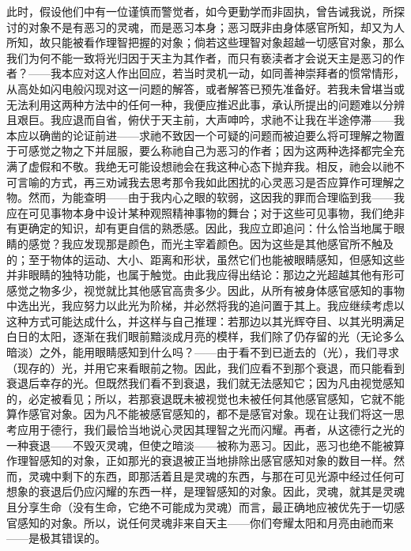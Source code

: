 此时，假设他们中有一位谨慎而警觉者，如今更勤学而非固执，曾告诫我说，所探讨的对象不是有恶习的灵魂，而是恶习本身；恶习既非由身体感官所知，却又为人所知，故只能被看作理智把握的对象；倘若这些理智对象超越一切感官对象，那么我们为何不能一致将光归因于天主为其作者，而只有亵渎者才会说天主是恶习的作者？——我本应对这人作出回应，若当时灵机一动，如同善神崇拜者的惯常情形，从高处如闪电般闪现对这一问题的解答，或者解答已预先准备好。若我未曾堪当或无法利用这两种方法中的任何一种，我便应推迟此事，承认所提出的问题难以分辨且艰巨。我应退而自省，俯伏于天主前，大声呻吟，求祂不让我在半途停滞——我本应以确凿的论证前进——求祂不致因一个可疑的问题而被迫要么将可理解之物置于可感觉之物之下并屈服，要么称祂自己为恶习的作者；因为这两种选择都完全充满了虚假和不敬。我绝无可能设想祂会在我这种心态下抛弃我。相反，祂会以祂不可言喻的方式，再三劝诫我去思考那令我如此困扰的心灵恶习是否应算作可理解之物。然而，为能查明——由于我内心之眼的软弱，这因我的罪而合理临到我——我应在可见事物本身中设计某种观照精神事物的舞台；对于这些可见事物，我们绝非有更确定的知识，却有更自信的熟悉感。因此，我应立即追问：什么恰当地属于眼睛的感觉？我应发现那是颜色，而光主宰着颜色。因为这些是其他感官所不触及的；至于物体的运动、大小、距离和形状，虽然它们也能被眼睛感知，但感知这些并非眼睛的独特功能，也属于触觉。由此我应得出结论：那边之光超越其他有形可感觉之物多少，视觉就比其他感官高贵多少。因此，从所有被身体感官感知的事物中选出光，我应努力以此光为阶梯，并必然将我的追问置于其上。我应继续考虑以这种方式可能达成什么，并这样与自己推理：若那边以其光辉夺目、以其光明满足白日的太阳，逐渐在我们眼前黯淡成月亮的模样，我们除了仍存留的光（无论多么暗淡）之外，能用眼睛感知到什么吗？——由于看不到已逝去的（光），我们寻求（现存的）光，并用它来看眼前之物。因此，我们应看不到那个衰退，而只能看到衰退后幸存的光。但既然我们看不到衰退，我们就无法感知它；因为凡由视觉感知的，必定被看见；所以，若那衰退既未被视觉也未被任何其他感官感知，它就不能算作感官对象。因为凡不能被感官感知的，都不是感官对象。现在让我们将这一思考应用于德行，我们最恰当地说心灵因其理智之光而闪耀。再者，从这德行之光的一种衰退——不毁灭灵魂，但使之暗淡——被称为恶习。因此，恶习也绝不能被算作理智感知的对象，正如那光的衰退被正当地排除出感官感知对象的数目一样。然而，灵魂中剩下的东西，即那活着且是灵魂的东西，与那在可见光源中经过任何可想象的衰退后仍应闪耀的东西一样，是理智感知的对象。因此，灵魂，就其是灵魂且分享生命（没有生命，它绝不可能成为灵魂）而言，最正确地应被优先于一切感官感知的对象。所以，说任何灵魂非来自天主——你们夸耀太阳和月亮由祂而来——是极其错误的。\par

